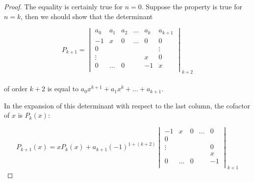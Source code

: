 \documentclass[11pt]{amsbook}
\begin{document}
\begin{proof}
The equality is certainly true for $n=0$. Suppose the property is true for $n=k$, then we should show that the determinant

\begin{equation*}
  P_{k+1} = 
  \begin{vmatrix}
   a_0 & a_1 & a_2 & \dots & a_k & a_{k+1} \\
    -1 & x & 0 & \dots & 0 & 0\\
    0 & & & & & \vdots \\
    \vdots & & & & x & 0\\
    0 & \dots & 0 & & -1 & x \\
  \end{vmatrix}_{k+2}
\end{equation*}\\

\noindent of order $k+2$ is equal to $a_0 x^{k+1} + a_1 x^k + \dots + a_{k+1}$.\newline

\par In the expansion of this determinant with respect to the last column, the cofactor of $x$ is $P_k(x)$:

\begin{equation*}
  P_{k+1}(x) = x P_k(x) + a_{k+1}(-1)^{1+(k+2)}
  \begin{vmatrix}
  -1 & x & 0 & \dots & 0\\
  0\\
  \vdots & & & & 0\\
  & & & & x\\
  0 & \dots & 0 & & -1\\
  \end{vmatrix}_{k+1}
\end{equation*}
\end{proof}

\end{document}
